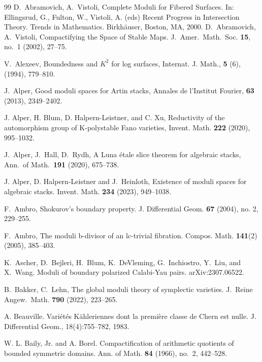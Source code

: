 \documentclass[12pt,twoside]{amsart}
\theoremstyle{definition}
\begin{document}
\begin{thebibliography}{99}
 D.~Abramovich, A.~Vistoli, Complete Moduli for Fibered Surfaces. In: Ellingsrud, G., Fulton, W., Vistoli, A. (eds) Recent Progress in Intersection Theory. Trends in Mathematics. Birkhäuser, Boston, MA, 2000.
 D.~Abramovich, A.~Vistoli, Compactifying the Space of Stable Maps. J.~Amer.~Math.~Soc. {\bf 15}, no.~1 (2002), 27--75.


V.~Alexeev, 
Boundedness and $K^2$ for log surfaces, 
Internat. J. Math., {\bf5} (6), (1994), 779–810.


 J.~Alper, Good moduli spaces for Artin stacks,
Annales de l'Institut Fourier, {\bf63} (2013), 2349--2402. 

  J. Alper, H. Blum, D. Halpern-Leistner, and C. Xu, Reductivity of the automorphism group of K-polystable Fano varieties, Invent. Math. {\bf222} (2020), 995--1032.

 J.~Alper, J.~Hall, D.~Rydh, A Luna \'{e}tale slice theorem for algebraic stacks, Ann.~of Math.~{\bf 191} (2020), 675--738.

 J. Alper, D. Halpern-Leistner and J.~Heinloth, Existence of moduli spaces for algebraic stacks. Invent. Math. {\bf 234} (2023), 949--1038.

 F.~Ambro, Shokurov's boundary property. J. Differential Geom. {\bf 67} (2004), no. 2, 229--255.

 F.~Ambro, The moduli b-divisor of an lc-trivial fibration. Compos. Math. {\bf 141}(2) (2005), 385--403.

 K.~Ascher, D.~Bejleri, H.~Blum, K.~DeVleming, G.~Inchiostro,
Y.~Liu, and X.~Wang. Moduli of boundary polarized Calabi-Yau pairs.
arXiv:2307.06522.


 B.~Bakker, C.~Lehn, The global moduli theory of symplectic varieties. J.~Reine Angew.~Math. {\bf 790} (2022), 223--265.

 A. Beauville. Vari\'{e}t\'{e}s K\"{a}hleriennes dont la premi\`{e}re classe de Chern est nulle. J. Differential Geom., 18(4):755–782, 1983.

W. L. Baily, Jr. and A. Borel. Compactification of arithmetic quotients of bounded symmetric domains. Ann. of Math. {\bf84} (1966), no.~2, 442--528.




\end{thebibliography}
\end{document}
